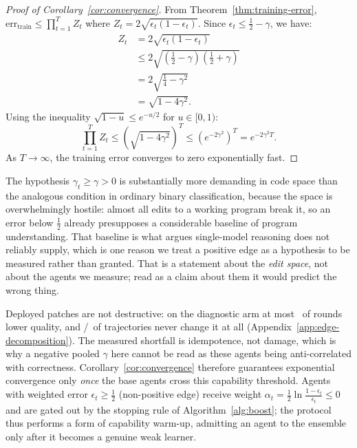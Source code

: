 \begin{proof}[Proof of Corollary~\ref{cor:convergence}]
From Theorem~\ref{thm:training-error}, $\mathrm{err}_{\mathrm{train}} \leq \prod_{t=1}^T Z_t$ where $Z_t = 2\sqrt{\epsilon_t(1-\epsilon_t)}$. Since $\epsilon_t \leq \frac{1}{2} - \gamma$, we have:
\begin{align*}
Z_t &= 2\sqrt{\epsilon_t(1 - \epsilon_t)} \\
&\leq 2\sqrt{\left(\tfrac{1}{2} - \gamma\right)\left(\tfrac{1}{2} + \gamma\right)} \\
&= 2\sqrt{\tfrac{1}{4} - \gamma^2} \\
&= \sqrt{1 - 4\gamma^2}.
\end{align*}
Using the inequality $\sqrt{1 - u} \leq e^{-u/2}$ for $u \in [0,1)$:
\[
\prod_{t=1}^T Z_t \leq \left(\sqrt{1 - 4\gamma^2}\right)^T \leq \left(e^{-2\gamma^2}\right)^T = e^{-2\gamma^2 T}.
\]
As $T \to \infty$, the training error converges to zero exponentially fast.
\end{proof}

\begin{remark}
\label{rem:capability-threshold}
The hypothesis $\gamma_t \geq \gamma > 0$ is substantially more demanding in code space than the analogous condition in ordinary binary classification, because the space is overwhelmingly hostile: almost all edits to a working program break it, so an error below $\tfrac{1}{2}$ already presupposes a considerable baseline of program understanding. That baseline is what \citet{kambhampati2024can} argues single-model reasoning does not reliably supply, which is one reason we treat a positive edge as a hypothesis to be measured rather than granted. That is a statement about the \emph{edit space}, not about the agents we measure; read as a claim about them it would predict the wrong thing.

Deployed patches are not destructive: on the diagnostic arm at most \statPBRegressMax\ of rounds lower quality, and \statPBHaikuFlat/\statPBSonnetFlat\ of trajectories never change it at all (Appendix~\ref{app:edge-decomposition}). The measured shortfall is idempotence, not damage, which is why a negative pooled $\gamma$ here cannot be read as these agents being anti-correlated with correctness. Corollary~\ref{cor:convergence} therefore guarantees exponential convergence only \emph{once} the base agents cross this capability threshold. Agents with weighted error $\epsilon_t \geq \tfrac{1}{2}$ (non-positive edge) receive weight $\alpha_t = \tfrac{1}{2}\ln\tfrac{1-\epsilon_t}{\epsilon_t} \leq 0$ and are gated out by the stopping rule of Algorithm~\ref{alg:boost}; the protocol thus performs a form of capability warm-up, admitting an agent to the ensemble only after it becomes a genuine weak learner.
\end{remark}

